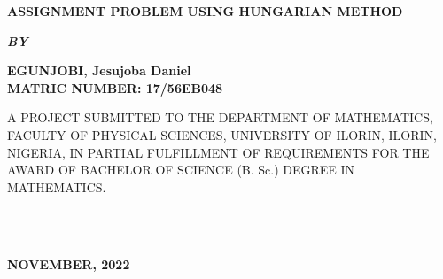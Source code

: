 \documentclass[11pt]{report}
\newcommand{\bt}[1]{\textbf{#1}}
\begin{document}
	
	\clearpage
	\thispagestyle{empty}
	\begin{center}
		\Large \bt{ASSIGNMENT PROBLEM USING HUNGARIAN METHOD}
	\end{center}

	\hspace{7cm}
	
	\begin{center}
		\textbf{\textit{BY}}
	\end{center}
	
	\hspace{5cm}
	
	\begin{center}
		\large \textbf{EGUNJOBI, Jesujoba Daniel
			\\
			MATRIC NUMBER: 17/56EB048}
	\end{center}
	
	\hspace{9cm}
	
	\begin{center}
		A PROJECT SUBMITTED TO THE DEPARTMENT OF MATHEMATICS, FACULTY OF PHYSICAL SCIENCES, UNIVERSITY OF ILORIN, ILORIN, NIGERIA, IN PARTIAL FULFILLMENT OF REQUIREMENTS FOR THE AWARD OF BACHELOR OF SCIENCE (B. Sc.) DEGREE IN MATHEMATICS.
	\end{center}
~~~~\\
	\hspace{8cm}
	~~~~~~~\\
	\begin{center}
		\textbf{NOVEMBER, 2022}
	\end{center}

	\newpage
\end{document}
